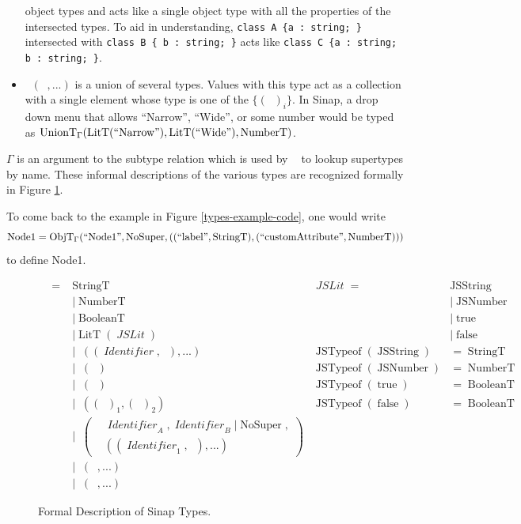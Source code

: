 \documentclass[12pt]{article}
\DeclareMathOperator{\StringT}{StringT}
\DeclareMathOperator{\NumberT}{NumberT}
\DeclareMathOperator{\BooleanT}{BooleanT}
\DeclareMathOperator{\LitT}{LitT}
\DeclareMathOperator{\JSLit}{\textit{JSLit}}
\DeclareMathOperator{\JSTypeof}{JSTypeof}
\DeclareMathOperator{\RecT}{RecT_\Gamma}
\DeclareMathOperator{\ObjT}{ObjT_\Gamma}
\DeclareMathOperator{\ListT}{ListT_\Gamma}
\DeclareMathOperator{\SetT}{SetT_\Gamma}
\DeclareMathOperator{\MapT}{MapT_\Gamma}
\DeclareMathOperator{\UnionT}{UnionT_\Gamma}
\DeclareMathOperator{\InterT}{InterT_\Gamma}
\DeclareMathOperator{\Identifier}{\textit{Identifier}}
\DeclareMathOperator{\Type}{{\textit{Type}_\Gamma}}
\DeclareMathOperator{\NoSuper}{NoSuper}
\DeclareMathOperator{\ObjectSubtype}{ObjectSubtype_\Gamma}
\begin{document}
\begin{itemize}
    object types and acts like a single object type with all the 
    properties of the intersected types. 
    To aid in understanding, \verb|class A {a : string; }| intersected
    with \verb|class B { b : string; }| acts like 
    \verb|class C {a : string; b : string; }|. 
    \item \(\UnionT(\Type, ...)\) is a union of several types. 
    Values with this type act as a collection with a single element
    whose type is one of the \(\{(\Type)_i\}\). In Sinap, a drop down 
    menu that allows ``Narrow'', ``Wide'', or some number would be 
    typed as \(\UnionT(\LitT(``\text{Narrow}"), \LitT(``\text{Wide}"),
     \NumberT)\).
\end{itemize}

\(\Gamma\) is an 
argument to the subtype relation which is used by \(\ObjectSubtype\) to 
lookup supertypes by name. These informal 
descriptions of the various types are recognized formally 
in Figure \ref{sinap-types-model}.

To come back to the example in Figure \ref{types-example-code}, 
one would write 
\[
    \operatorname{Node1} = \ObjT(``\text{Node1}", \NoSuper, (
        (``\text{label}", \StringT),
        (``\text{customAttribute}", \NumberT)
        ))
\]
to define Node1.

\linespread{1}
\begin{figure}
\begin{mdframed}
\begin{align*}
\Type = &\StringT   &\JSLit = &\operatorname{JSString} \\
&|\NumberT                 &&| \operatorname{JSNumber} \\
&|\BooleanT                &&| \operatorname{true} \\
&|\LitT(\JSLit)            &&| \operatorname{false} \\
&|\RecT((\Identifier, \Type), ...) & \JSTypeof(\operatorname{JSString}) &= \StringT \\
&|\ListT(\Type) & \JSTypeof(\operatorname{JSNumber}) &= \NumberT \\
&|\SetT(\Type) & \JSTypeof(\operatorname{true}) &= \BooleanT \\
&|\MapT((\Type)_1, (\Type)_2) & \JSTypeof(\operatorname{false}) &= \BooleanT \\
&|\ObjT\left(\begin{aligned}
    &\Identifier_A, \Identifier_B | \NoSuper, \\
&((\Identifier_1, \Type), ...)
\end{aligned}\right) \\
&|\InterT(\ObjT, ...) \\
&|\UnionT(\Type, ...)
\end{align*}
\end{mdframed}
\caption{Formal Description of Sinap Types.}
\label{sinap-types-model}
\end{figure}
\end{document}
